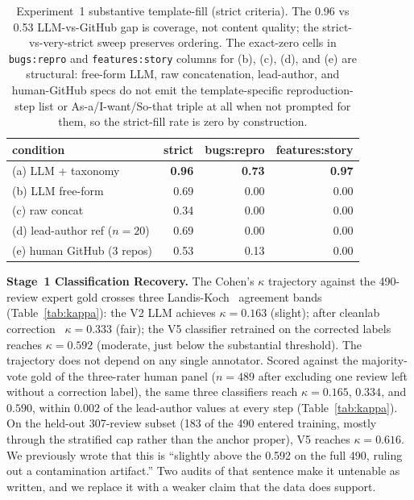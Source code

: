 \documentclass[preprint,12pt]{elsarticle}
\begin{document}
\begin{table}[!htbp]\centering\footnotesize
  \caption{Experiment~1 substantive template-fill (strict criteria). The 0.96 vs 0.53
  LLM-vs-GitHub gap is coverage, not content quality; the strict-vs-very-strict sweep preserves
  ordering. The exact-zero cells in \texttt{bugs:repro} and \texttt{features:story} columns for
  (b), (c), (d), and (e) are structural: free-form LLM, raw concatenation, lead-author, and
  human-GitHub specs do not emit the template-specific reproduction-step list or
  As-a/I-want/So-that triple at all when not prompted for them, so the strict-fill rate is zero
  by construction.}\label{tab:stage3}
  \begin{tabular}{lrrr}
  \toprule
  condition & strict & bugs:repro & features:story \\
  \midrule
  (a) LLM + taxonomy & \textbf{0.96} & \textbf{0.73} & \textbf{0.97} \\
  (b) LLM free-form & 0.69 & 0.00 & 0.00 \\
  (c) raw concat & 0.34 & 0.00 & 0.00 \\
  (d) lead-author ref ($n=20$) & 0.69 & 0.00 & 0.00 \\
  (e) human GitHub (3 repos) & 0.53 & 0.13 & 0.00 \\
  \bottomrule
  \end{tabular}
  \end{table}

\textbf{Stage~1 Classification Recovery.} The Cohen's $\kappa$ trajectory against the 490-review expert gold crosses three Landis-Koch~\cite{landis1977measurement} agreement bands (Table~\ref{tab:kappa}): the V2 LLM achieves $\kappa = 0.163$ (slight); after cleanlab correction~\cite{northcutt2021confident} $\kappa = 0.333$ (fair); the V5 classifier retrained on the corrected labels reaches $\kappa = 0.592$ (moderate, just below the substantial threshold). The trajectory does not depend on any single annotator. Scored against the majority-vote gold of the three-rater human panel ($n = 489$ after excluding one review left without a correction label), the same three classifiers reach $\kappa = 0.165$, $0.334$, and $0.590$, within $0.002$ of the lead-author values at every step (Table~\ref{tab:kappa}). On the held-out 307-review subset (183 of the 490 entered training, mostly through the stratified
cap rather than the anchor proper), V5 reaches $\kappa = 0.616$. We previously wrote that this is
``slightly above the 0.592 on the full 490, ruling out a contamination artifact.'' Two audits of
that sentence make it untenable as written, and we replace it with a weaker claim that the data
does support.
\end{document}
